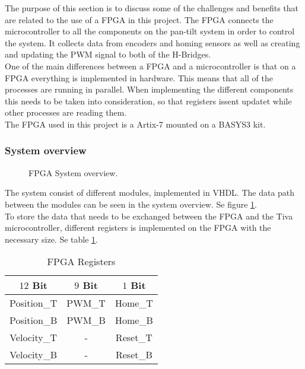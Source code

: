 \documentclass[../../../main]{subfiles}
\begin{document}
The purpose of this section is to discuss some of the challenges and benefits that are related to the use of a FPGA in this project.
The FPGA connects the microcontroller to all the components on the pan-tilt system in order to control the system. It collects data from encoders and homing sensors as well as creating and updating the PWM signal to both of the H-Bridges.
\\
One of the main differences between a FPGA and a microcontroller is that on a FPGA everything is implemented in hardware. This means that all of the processes are running in parallel.
When implementing the different components this needs to be taken into consideration, so that registers issent updatet while other processes are reading them.
\\
The FPGA used in this project is a Artix-7 mounted on a BASYS3 kit. 
\subsubsection{System overview}%
\label{sub:system_overview}

\begin{figure}[H]
  \centering
  \def\svgwidth{\textwidth}
  
  \caption{FPGA System overview.}
  \label{fig:FPGA_system_overview}
\end{figure}
The system consist of different modules, implemented in VHDL.
The data path between the modules can be seen in the system overview. Se figure \ref{fig:FPGA_system_overview}.
\\
To store the data that needs to be exchanged between the FPGA and the Tiva microcontroller, different registers is implemented on the FPGA with the necessary size. Se table \ref{table:FPGA_registers}.
\\
\begin{table}[H]
\centering
\begin{tabular}{|c|c|c|}
\hline
\textbf{$12$ Bit} & \textbf{$9$ Bit} & \textbf{$1$ Bit} \\ \hline
Position\_T     & PWM\_T         & Home\_T        \\ \hline
Position\_B     & PWM\_B         & Home\_B        \\ \hline
Velocity\_T     & -              & Reset\_T       \\ \hline
Velocity\_B     & -              & Reset\_B       \\ \hline
\end{tabular}
\caption{FPGA Registers}
\label{table:FPGA_registers}
\end{table}
\end{document}
